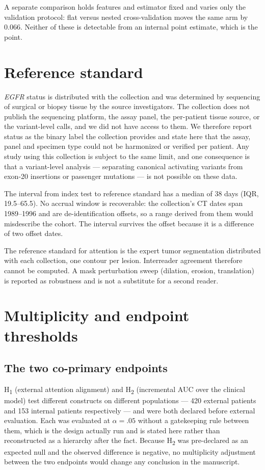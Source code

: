 \documentclass[11pt]{article}
\begin{document}
A separate comparison holds features and estimator fixed and varies only the
validation protocol: flat versus nested cross-validation moves the same arm by
0.066. Neither of these is detectable from an internal point estimate, which is
the point.

\section{Reference standard}

\textit{EGFR} status is distributed with the collection and was determined by
sequencing of surgical or biopsy tissue by the source investigators. The
collection does not publish the sequencing platform, the assay panel, the
per-patient tissue source, or the variant-level calls, and we did not have access
to them. We therefore report status as the binary label the collection provides
and state here that the assay, panel and specimen type could not be harmonized or
verified per patient. Any study using this collection is subject to the same
limit, and one consequence is that a variant-level analysis --- separating
canonical activating variants from exon-20 insertions or passenger mutations ---
is not possible on these data.

The interval from index test to reference standard has a median of 38 days
(IQR, 19.5--65.5). No accrual window is recoverable: the collection's CT dates
span 1989--1996 and are de-identification offsets, so a range derived from them
would misdescribe the cohort. The interval survives the offset because it is a
difference of two offset dates.

The reference standard for attention is the expert tumor segmentation
distributed with each collection, one contour per lesion. Interreader agreement
therefore cannot be computed. A mask perturbation sweep (dilation, erosion,
translation) is reported as robustness and is not a substitute for a second
reader.

\section{Multiplicity and endpoint thresholds}

\subsection{The two co-primary endpoints}

H\textsubscript{1} (external attention alignment) and H\textsubscript{2}
(incremental AUC over the clinical model) test different constructs on different
populations --- 420 external patients and 153 internal patients respectively ---
and were both declared before external evaluation. Each was evaluated at
$\alpha = .05$ without a gatekeeping rule between them, which is the design
actually run and is stated here rather than reconstructed as a hierarchy after
the fact. Because H\textsubscript{2} was pre-declared as an expected null and the
observed difference is negative, no multiplicity adjustment between the two
endpoints would change any conclusion in the manuscript.
\end{document}
